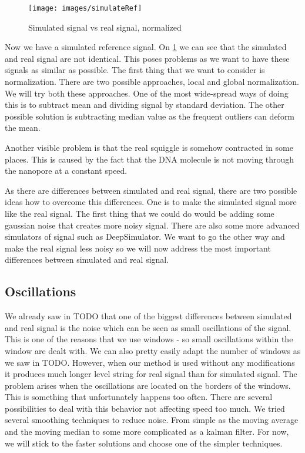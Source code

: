 \begin{figure}
\centerline{\texttt{[image: images/simulateRef]}}
\caption[Hehe]{Simulated signal vs real signal, normalized}
\label{obr:simVsReal}
\end{figure}

Now we have a simulated reference signal. On \ref{obr:simVsReal} we can see that the simulated and real
signal are not identical. This poses problems as we want to have these signals as
similar as possible. The first thing that we want to consider is normalization. There
are two possible approaches, local and global normalization. We will try both these
approaches. One of the most wide-spread ways of doing this is to subtract mean and dividing
signal by standard deviation. The other possible solution is subtracting median value
as the frequent outliers can deform the mean.

Another visible problem is that the real squiggle is somehow contracted
in some places. This is caused by the fact that the DNA molecule is not moving
through the nanopore at a constant speed.

As there are differences between simulated and real signal, there are two possible
ideas how to overcome this differences. One is to make the simulated signal more like
the real signal. The first thing that we could do would be adding some gaussian noise
that creates more noisy signal. There are also some more advanced simulators of
signal such as DeepSimulator. We want to go the other way and make the real signal
less noisy so we will now address the most important differences between simulated and real signal.


\subsection{Oscillations}

We already saw in TODO that one of the biggest differences between simulated and
real signal is the noise which can be seen as small oscillations of the signal. This is
one of the reasons that we use windows - so small oscillations within the window
are dealt with. We can also pretty easily adapt the number of windows as we saw in TODO.
However, when our method is used without any modifications it
produces much longer level string for real signal than for simulated signal.
The problem arises when the oscillations are located on the borders of the windows.
This is something that unfortunately happens too often.
There are several possibilities to deal with this behavior not affecting speed too
much. We tried several smoothing techniques to reduce noise. From simple as the
moving average and the moving median to some more complicated as a kalman filter.
For now, we will stick to the faster solutions and choose one of the simpler techniques.

